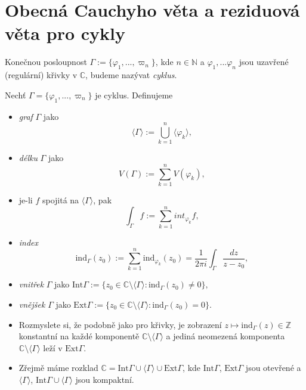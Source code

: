 \section{Obecná Cauchyho věta a reziduová věta pro cykly}

\begin{definition}
Konečnou posloupnost $\Gamma:=\{\varphi_1, ... ,\varpi_n\}$, kde $n\in\mathbb{N}$ a $\varphi_1, ... \varphi_n$ jsou uzavřené (regulární) křivky v $\mathbb{C}$, budeme nazývat \emph{cyklus}.
\end{definition}

\begin{notation}
Nechť $\Gamma = \{\varphi_1, ... ,\varpi_n\}$ je cyklus. Definujeme
\begin{itemize}
    \item \emph{graf} $\Gamma$ jako $$\langle\Gamma\rangle:=\bigcup_{k=1}^n \langle\varphi_k\rangle,$$
    \item \emph{délku} $\Gamma$ jako $$V\left(\Gamma\right):=\sum_{k=1}^n V(\varphi_k),$$ 
    \item je-li $f$ spojitá na $\langle\Gamma\rangle$, pak $$\int_\Gamma f := \sum_{k=1}^n int_{\varphi_k}f,$$
    \item \emph{index} $$\text{ind}_\Gamma(z_0):=\sum_{k=1}^n \text{ind}_{\varphi_k}(z_0) = \frac{1}{2\pi i}\int_\Gamma \frac{dz}{z-z_0},$$
    \item \emph{vnitřek} $\Gamma$ jako $\text{Int}\Gamma:=\{z_0\in\mathbb{C}\setminus\langle\Gamma\rangle: \text{ind}_\Gamma(z_0)\neq 0\},$
    \item \emph{vnějšek} $\Gamma$ jako $\text{Ext} \Gamma:=\{z_0\in\mathbb{C}\setminus\langle\Gamma\rangle: \text{ind}_\Gamma(z_0)=0\}.$
\end{itemize}
\end{notation}

\begin{note}
\begin{itemize}
    \item Rozmyslete si, že podobně jako pro křivky, je zobrazení $z\mapsto\text{ind}_\Gamma(z)\in\mathbb{Z}$ konstantní na každé komponentě $\mathbb{C}\setminus\langle\Gamma\rangle$ a jediná neomezená komponenta $\mathbb{C}\setminus\langle\Gamma\rangle$ leží v $\text{Ext}\Gamma$.
    \item Zřejmě máme rozklad $\mathbb{C}=\text{Int}\Gamma\cup\langle\Gamma\rangle\cup\text{Ext} \Gamma$, kde $\text{Int} \Gamma$, $\text{Ext} \Gamma$ jsou otevřené a $\langle\Gamma\rangle$, $\text{Int} \Gamma\cup\langle\Gamma\rangle$ jsou kompaktní.
\end{itemize}
\end{note}

